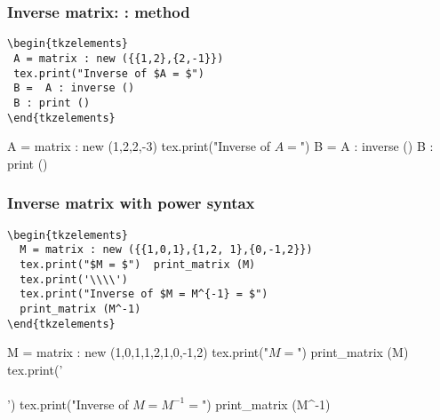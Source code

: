 
\subsubsection{Inverse matrix: : method  } %
\label{ssub:inverse_matrix}

\begin{minipage}{.6\textwidth}
\begin{Verbatim}
\begin{tkzelements}
 A = matrix : new ({{1,2},{2,-1}}) 
 tex.print("Inverse of $A = $")
 B =  A : inverse ()
 B : print ()
\end{tkzelements}
\end{Verbatim}
\end{minipage}
\begin{minipage}{.4\textwidth}
\begin{tkzelements}
  A = matrix : new ({{1,2},{2,-3}}) 
 tex.print("Inverse of $A = $")
 B =  A : inverse ()
 B : print ()
\end{tkzelements}
\end{minipage}

\subsubsection{Inverse matrix with power syntax} %
\label{ssub:inverse_matrix_with_power_syntax}

\begin{minipage}{.6\textwidth}
\begin{Verbatim}
\begin{tkzelements}
  M = matrix : new ({{1,0,1},{1,2, 1},{0,-1,2}})
  tex.print("$M = $")  print_matrix (M) 
  tex.print('\\\\')
  tex.print("Inverse of $M = M^{-1} = $")
  print_matrix (M^-1)
\end{tkzelements}
\end{Verbatim}
\end{minipage}
\begin{minipage}{.4\textwidth}
\begin{tkzelements}
  M = matrix : new  ({{1,0,1},{1,2,1},{0,-1,2}})
  tex.print("$M = $")  print_matrix (M) tex.print('\\\\')
  tex.print("Inverse of $M = M^{-1} = $")
  print_matrix (M^-1)
\end{tkzelements}
\end{minipage}


